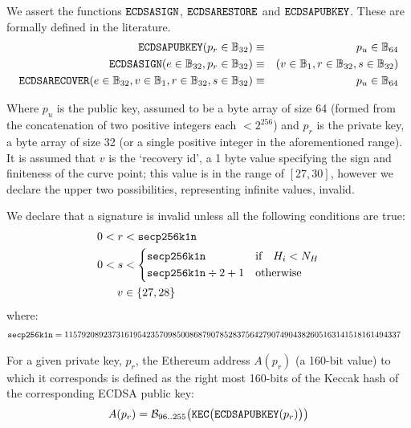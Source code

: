 \documentclass[9pt,oneside]{amsart}
\newcommand{\firsthomesteadblock}{\ensuremath{N_H}}
\begin{document}
We assert the functions $\mathtt{\small ECDSASIGN}$, $\mathtt{\small ECDSARESTORE}$ and $\mathtt{\small ECDSAPUBKEY}$. These are formally defined in the literature.
\begin{eqnarray}
\mathtt{\small ECDSAPUBKEY}(p_r \in \mathbb{B}_{32}) & \equiv & p_u \in \mathbb{B}_{64} \\
\mathtt{\small ECDSASIGN}(e \in \mathbb{B}_{32}, p_r \in \mathbb{B}_{32}) & \equiv & (v \in \mathbb{B}_{1}, r \in \mathbb{B}_{32}, s \in \mathbb{B}_{32}) \\
\mathtt{\small ECDSARECOVER}(e \in \mathbb{B}_{32}, v \in \mathbb{B}_{1}, r \in \mathbb{B}_{32}, s \in \mathbb{B}_{32}) & \equiv & p_u \in \mathbb{B}_{64}
\end{eqnarray}

Where $p_u$ is the public key, assumed to be a byte array of size 64 (formed from the concatenation of two positive integers each $< 2^{256}$) and $p_r$ is the private key, a byte array of size 32 (or a single positive integer in the aforementioned range). It is assumed that $v$ is the `recovery id', a 1 byte value specifying the sign and finiteness of the curve point; this value is in the range of $[27, 30]$, however we declare the upper two possibilities, representing infinite values, invalid.

\newcommand{\slimit}{\ensuremath{\text{s-limit}}}

We declare that a signature is invalid unless all the following conditions are true:
\begin{align}
0 < r &< \mathtt{\tiny secp256k1n} \\
0 < s &< \begin{dcases}
\mathtt{\tiny secp256k1n} & \text{if} \quad H_i < \firsthomesteadblock \\
\mathtt{\tiny secp256k1n} \div 2 + 1 & \text{otherwise} \\
\end{dcases} \\
 v &\in \{27,28\}
\end{align}
where:
\begin{align}
\mathtt{\tiny secp256k1n} &= 115792089237316195423570985008687907852837564279074904382605163141518161494337
\end{align}

For a given private key, $p_r$, the Ethereum address $A(p_r)$ (a 160-bit value) to which it corresponds is defined as the right most 160-bits of the Keccak hash of the corresponding ECDSA public key:
\begin{equation}
A(p_r) = \mathcal{B}_{96..255}\big(\mathtt{\tiny KEC}\big( \mathtt{\small ECDSAPUBKEY}(p_r) \big) \big)
\end{equation}
\end{document}
